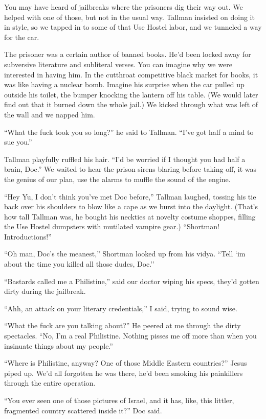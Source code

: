 \documentclass[oneside]{book}
\begin{document}
You may have heard of jailbreaks where the prisoners dig their way out.
We helped with one of those, but not in the usual way.  Tallman insisted
on doing it in style, so we tapped in to some of that Use Hostel labor,
and we tunneled a way for the car.

The prisoner was a certain author of banned books.  He'd been locked away
for subversive literature and subliteral verses.  You can imagine why
we were interested in having him.  In the cutthroat competitive black
market for books, it was like having a nuclear bomb.  Imagine his surprise
when the car pulled up outside his toilet, the bumper knocking the lantern
off his table.  (We would later find out that it burned down the whole
jail.)  We kicked through what was left of the wall and we napped him.

``What the fuck took you so long?'' he said to Tallman.  ``I've got half a
mind to sue you.''

Tallman playfully ruffled his hair.  ``I'd be worried if I thought you had
half a brain, Doc.''  We waited to hear the prison sirens
blaring before taking off, it was the genius of our plan, use the alarms to muffle
the sound of the engine.

``Hey Yu, I don't think you've met Doc before,'' Tallman laughed, tossing his tie back
over his shoulders to blow like a cape as we burst into the daylight.  (That's how
tall Tallman was, he bought his neckties at novelty costume shoppes, filling the Use Hostel
dumpsters with mutilated vampire gear.)  ``Shortman!  Introductions!''

``Oh man, Doc's the meanest,'' Shortman looked up from his vidya.
``Tell `im about the time you killed all those dudes, Doc.''

``Bastards called me a Philistine,'' said our doctor wiping his specs, they'd gotten
dirty during the jailbreak.

``Ahh, an attack on your literary credentials,'' I said, trying to sound wise.

``What the fuck are you talking about?''  He peered at me through the dirty
spectacles.  ``No, I'm a real Philistine.  Nothing pisses me off more than
when you insinuate things about my people.''

``Where is Philistine, anyway?  One of those Middle Eastern countries?''
Jesus piped up.  We'd all forgotten he was there, he'd been smoking
his painkillers through the entire operation.

``You ever seen one of those pictures of Israel, and it has, like, this littler,
fragmented country scattered inside it?'' Doc said.
\end{document}
